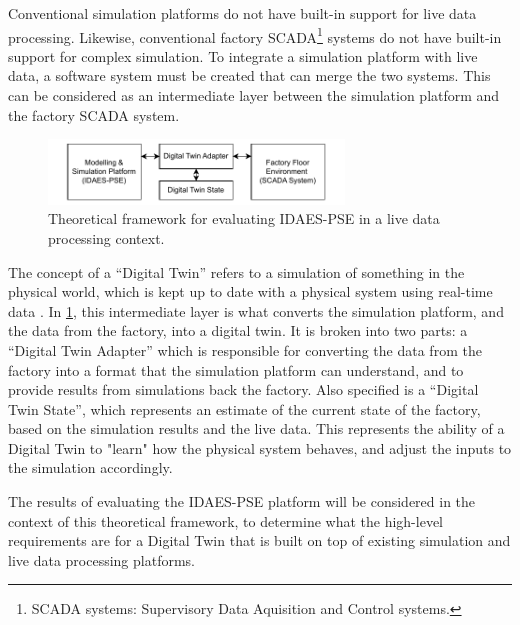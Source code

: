\documentclass[12pt]{article}
\begin{document}
Conventional simulation platforms do not have built-in support for live data processing. Likewise, conventional factory SCADA\footnote{SCADA systems: Supervisory Data Aquisition and Control systems.} systems do not have built-in support for complex simulation. To integrate a simulation platform with live data, a software system must be created that can merge the two systems. This can be considered as an intermediate layer between the simulation platform and the factory SCADA system.


\begin{figure}[h]
    \centering
    \includegraphics[width=0.7\textwidth]{research_journal_framework_simple.pdf}
    \caption{Theoretical framework for evaluating IDAES-PSE in a live data processing context.}
    \label{fig:theoretical_framework}
\end{figure}

The concept of a “Digital Twin” refers to a simulation of something in the physical world, which is kept up to date with a physical system using real-time data \cite{yu2022energy}.
In \cref{fig:theoretical_framework}, this intermediate layer is what converts the simulation platform, and the data from the factory, into a digital twin. It is broken into two parts: a ``Digital Twin Adapter'' which is responsible for converting the data from the factory into a format that the simulation platform can understand, and to provide results from simulations back the factory. Also specified is a ``Digital Twin State'', which represents an estimate of the current state of the factory, based on the simulation results and the live data. This represents the ability of a Digital Twin to "learn" how the physical system behaves, and adjust the inputs to the simulation accordingly.

The results of evaluating the IDAES-PSE platform will be considered in the context of this theoretical framework, to determine what the high-level requirements are for a Digital Twin that is built on top of existing simulation and live data processing platforms.
\end{document}
